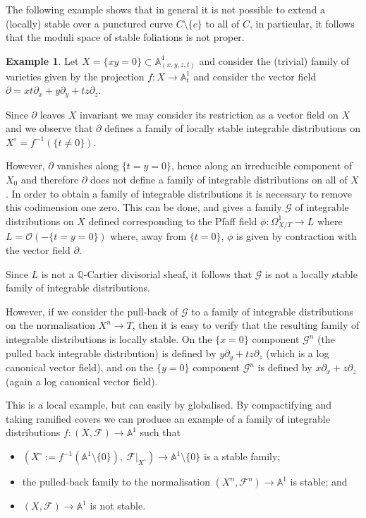 \documentclass[12pt, a4paper]{amsart}
\theoremstyle{definition}
\newtheorem{ej}[theorem]{Example}
\theoremstyle{named}
\begin{document}
The following example shows that in general it is not possible to extend a (locally) stable over a punctured curve $C \setminus \{c\}$ to all of $C$, in particular, it follows that the moduli space of stable foliations is not proper. 

\begin{ej}
\label{non-normal-not-proper}
    Let $X = \{xy = 0\} \subset \mathbb A^4_{(x, y, z, t)}$ and consider the (trivial) family of varieties given by the projection $f\colon X \to \mathbb A^1_t$ and consider the vector field $\partial = xt\partial_x+y\partial_y+tz\partial_z$.

Since $\partial$ leaves $X$ invariant we may consider its restriction as a vector field on $X$ and we observe that $\partial$ defines a family of locally stable integrable distributions on $X^\circ = f^{-1}(\{t \neq 0\})$.

However, $\partial$ vanishes along $\{t = y = 0\}$, hence along an irreducible component of $X_0$ and therefore $\partial$ does not define a family of integrable distributions on all of $X$.  In order to obtain a family of integrable distributions it is necessary to remove this codimension one zero.  This can be done, and gives a family $\mathcal G$ of integrable distributions on $X$ defined corresponding to the Pfaff field $\phi\colon \Omega^1_{X/T} \to L$ where $L = \mathcal O(-\{t = y = 0\})$ where, away from $\{t = 0\}$,  $\phi$ is given by contraction with the vector field $\partial$.

Since $L$ is not a $\mathbb Q$-Cartier divisorial sheaf, it follows that $\mathcal G$ is not a locally stable family of integrable distributions.

However, if we consider the pull-back of $\mathcal G$ to a family of integrable distributions on the normalisation $X^n \to T$, then it is easy to verify that the resulting family of integrable distributions is locally stable.  On the $\{x = 0\}$ component $\mathcal G^n$ (the pulled back integrable distribution) is defined by $y\partial_y+tz\partial_z$ (which is a log canonical vector field), and on the $\{y = 0\}$ component $\mathcal G^n$ is defined by $x\partial_x+z\partial_z$ (again a log canonical vector field).

This is a local example, but can easily by globalised.  By compactifying and taking ramified covers we can produce an example of a family of integrable distributions
$f\colon (X, \mathcal F) \to \mathbb A^1$ such that 
\begin{itemize}
    \item $(X^\circ := f^{-1}(\mathbb A^{1}\setminus \{0\}), ~\mathcal F|_{X^\circ}) \to \mathbb A^{1}\setminus \{0\}$
    is a stable family;
    \item the pulled-back family to the normalisation $(X^n, \mathcal F^n) \to \mathbb A^1$ is stable; and 
    \item $(X, \mathcal F) \to \mathbb A^1$
    is not stable.
\end{itemize}



\end{ej}
\end{document}

